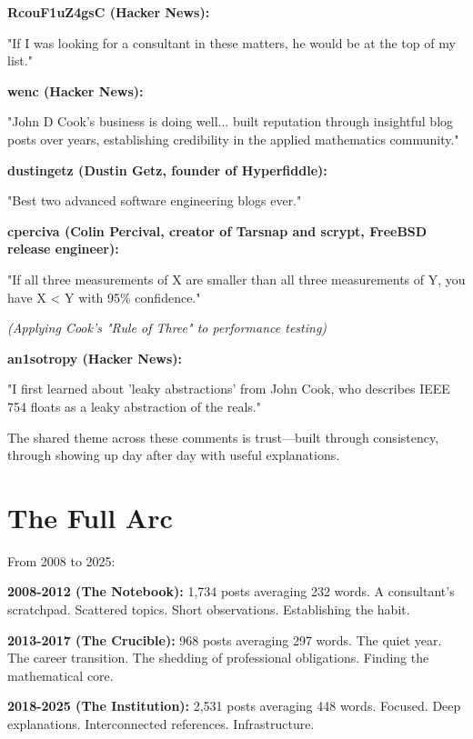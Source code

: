 \textbf{RcouF1uZ4gsC (Hacker News):}
\begin{blogquote}
"If I was looking for a consultant in these matters, he would be at the top of my list."
\end{blogquote}

\textbf{wenc (Hacker News):}
\begin{blogquote}
"John D Cook's business is doing well... built reputation through insightful blog posts over years, establishing credibility in the applied mathematics community."
\end{blogquote}

\textbf{dustingetz (Dustin Getz, founder of Hyperfiddle):}
\begin{blogquote}
"Best two advanced software engineering blogs ever."
\end{blogquote}

\textbf{cperciva (Colin Percival, creator of Tarsnap and scrypt, FreeBSD release engineer):}
\begin{blogquote}
"If all three measurements of X are smaller than all three measurements of Y, you have X < Y with 95\% confidence."
\end{blogquote}
\textit{(Applying Cook's "Rule of Three" to performance testing)}


\textbf{an1sotropy (Hacker News):}
\begin{blogquote}
"I first learned about 'leaky abstractions' from John Cook, who describes IEEE 754 floats as a leaky abstraction of the reals."
\end{blogquote}

The shared theme across these comments is trust---built through consistency, through showing up day after day with useful explanations.

\bigskip

\section*{The Full Arc}

From 2008 to 2025:

\textbf{2008-2012 (The Notebook):} 1,734 posts averaging 232 words. A consultant's scratchpad. Scattered topics. Short observations. Establishing the habit.

\textbf{2013-2017 (The Crucible):} 968 posts averaging 297 words. The quiet year. The career transition. The shedding of professional obligations. Finding the mathematical core.

\textbf{2018-2025 (The Institution):} 2,531 posts averaging 448 words. Focused. Deep explanations. Interconnected references. Infrastructure.

